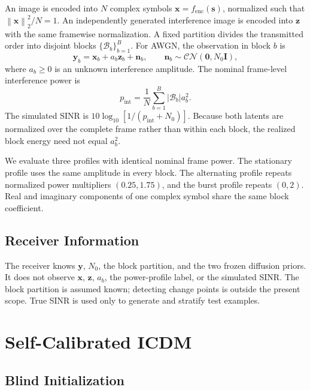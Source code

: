 \documentclass[conference]{IEEEtran}
\newcommand{\vect}[1]{\boldsymbol{#1}}
\newcommand{\norm}[1]{\left\lVert#1\right\rVert}
\begin{document}
An image is encoded into $N$ complex symbols
$\vect{x}=f_{\mathrm{enc}}(\vect{s})$, normalized such that
$\norm{\vect{x}}_2^2/N=1$. An independently generated interference image is
encoded into $\vect{z}$ with the same framewise normalization. A fixed
partition divides the transmitted order into disjoint blocks
$\{\mathcal{B}_b\}_{b=1}^{B}$. For AWGN, the observation in block $b$ is
\begin{equation}
    \vect{y}_b=\vect{x}_b+a_b\vect{z}_b+\vect{n}_b,\qquad
    \vect{n}_b\sim\mathcal{CN}(\vect{0},N_0\vect{I}),
    \label{eq:system}
\end{equation}
where $a_b\geq 0$ is an unknown interference amplitude. The nominal
frame-level interference power is
\begin{equation}
    p_{\mathrm{int}}=
    \frac{1}{N}\sum_{b=1}^{B}|\mathcal{B}_b|a_b^2.
    \label{eq:nominal_power}
\end{equation}
The simulated SINR is
$10\log_{10}[1/(p_{\mathrm{int}}+N_0)]$. Because both latents are normalized
over the complete frame rather than within each block, the realized block
energy need not equal $a_b^2$.

We evaluate three profiles with identical nominal frame power. The stationary
profile uses the same amplitude in every block. The alternating profile
repeats normalized power multipliers $(0.25,1.75)$, and the burst profile
repeats $(0,2)$. Real and imaginary components of one complex symbol share
the same block coefficient.

\subsection{Receiver Information}

The receiver knows $\vect{y}$, $N_0$, the block partition, and the two frozen
diffusion priors. It does not observe $\vect{x}$, $\vect{z}$, $a_b$, the
power-profile label, or the simulated SINR. The block partition is assumed
known; detecting change points is outside the present scope. True SINR is
used only to generate and stratify test examples.

\section{Self-Calibrated ICDM}

\subsection{Blind Initialization}
\end{document}
